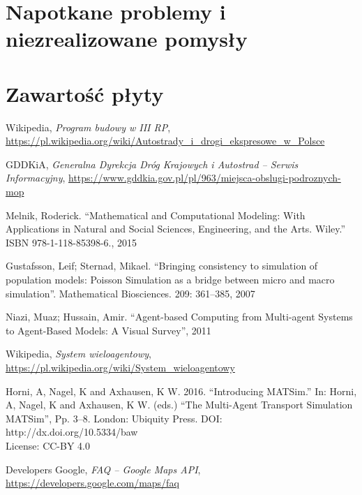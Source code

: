 \chapter{Napotkane problemy i niezrealizowane pomysły}

\chapter{Zawartość płyty}

\begin{thebibliography}{99}

 Wikipedia, \textit{Program budowy w III RP},\\ \url{https://pl.wikipedia.org/wiki/Autostrady\_i\_drogi\_ekspresowe\_w\_Polsce}

 GDDKiA, \textit{Generalna Dyrekcja Dróg Krajowych i Autostrad -- Serwis Informacyjny}, \url{https://www.gddkia.gov.pl/pl/963/miejsca-obslugi-podroznych-mop}

Melnik, Roderick. ``Mathematical and Computational Modeling: With Applications in Natural and Social Sciences, Engineering, and the Arts. Wiley.'' ISBN 978-1-118-85398-6., 2015

Gustafsson, Leif; Sternad, Mikael. ``Bringing consistency to simulation of population models: Poisson Simulation as a bridge between micro and macro simulation''. Mathematical Biosciences. 209: 361–385, 2007

 Niazi, Muaz; Hussain, Amir. ``Agent-based Computing from Multi-agent Systems to Agent-Based Models: A Visual Survey'', 2011

 Wikipedia, \textit{System wieloagentowy},\\ \url{https://pl.wikipedia.org/wiki/System_wieloagentowy}

 Horni, A, Nagel, K and Axhausen, K W. 2016. ``Introducing MATSim.'' In: Horni, A, Nagel, K and
Axhausen, K W. (eds.) ``The Multi-Agent Transport Simulation MATSim'', Pp. 3–8. London: Ubiquity Press. DOI: http://dx.doi.org/10.5334/baw \\ License: CC-BY 4.0

 Developers Google, \textit{FAQ -- Google Maps API},\\ \url{https://developers.google.com/maps/faq}

\end{thebibliography}




